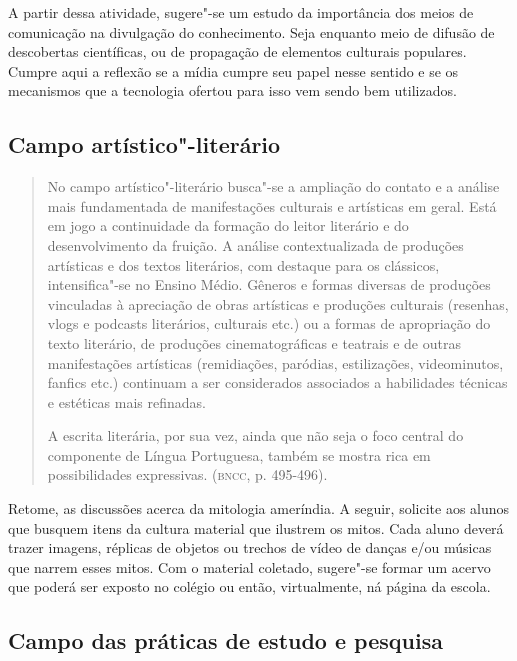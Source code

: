 \documentclass[12pt]{extarticle}
\begin{document}
  A partir dessa atividade, sugere"-se um estudo da importância dos meios
  de comunicação na divulgação do conhecimento. Seja enquanto meio de
  difusão de descobertas científicas, ou de propagação de elementos
  culturais populares. Cumpre aqui a reflexão se a mídia cumpre seu
  papel nesse sentido e se os mecanismos que a tecnologia ofertou para
  isso vem sendo bem utilizados.

\subsection{Campo artístico"-literário}

\begin{quote}
No campo artístico"-literário busca"-se a ampliação do contato e a
análise mais fundamentada de manifestações culturais e artísticas em
geral. Está em jogo a continuidade da formação do leitor literário e do
desenvolvimento da fruição. A análise contextualizada de produções
artísticas e dos textos literários, com destaque para os clássicos,
intensifica"-se no Ensino Médio. Gêneros e formas diversas de produções
vinculadas à apreciação de obras artísticas e produções culturais
(resenhas, vlogs e podcasts literários, culturais etc.) ou a formas de
apropriação do texto literário, de produções cinematográficas e teatrais
e de outras manifestações artísticas (remidiações, paródias,
estilizações, videominutos, fanfics etc.) continuam a ser considerados
associados a habilidades técnicas e estéticas mais refinadas.

A escrita literária, por sua vez, ainda que não seja o foco central do
componente de Língua Portuguesa, também se mostra rica em possibilidades
expressivas. (\textsc{bncc}, p. 495-496).
\end{quote}

Retome, as discussões acerca da mitologia ameríndia. A seguir,
  solicite aos alunos que busquem itens da cultura material que ilustrem
  os mitos. Cada aluno deverá trazer imagens, réplicas de objetos ou
  trechos de vídeo de danças e/ou músicas que narrem esses mitos. Com o
  material coletado, sugere"-se formar um acervo que poderá ser exposto
  no colégio ou então, virtualmente, ná página da escola.

\subsection{Campo das práticas de estudo e pesquisa}
\end{document}
